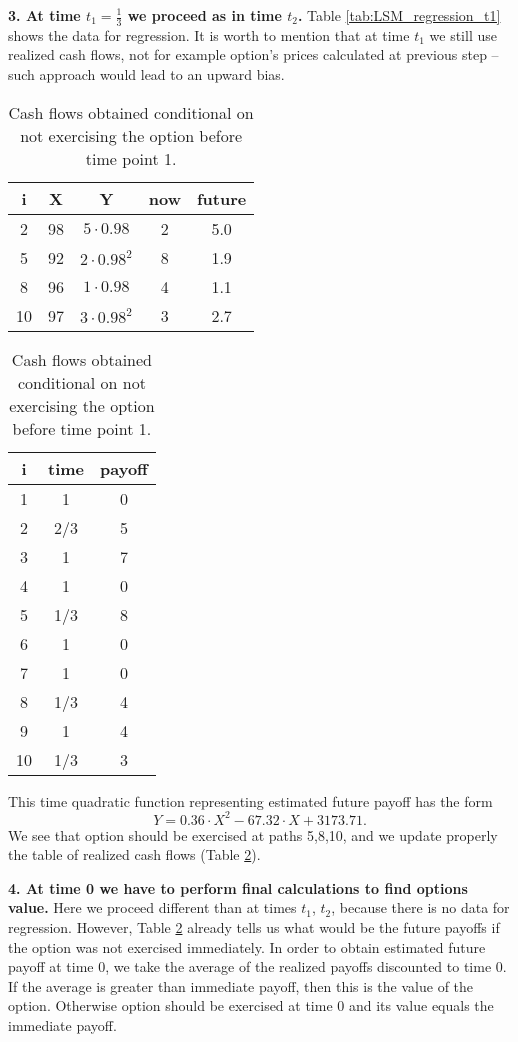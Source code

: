 \documentclass[a4paper,11pt, twoside]{book}
\theoremstyle{definition}
\theoremstyle{remark}
\newcounter{example}[chapter]
\begin{document}
\noindent \textbf{3. At time $t_1 = \frac{1}{3}$ we proceed as in time $t_2$.}
Table \ref{tab:LSM_regression_t1} shows the data for regression. It is worth to mention that at time $t_1$ we still use realized cash flows, not for example option's prices calculated at previous step -- such approach would lead to an upward bias.
\begin{table}[ht]
\parbox{.45\linewidth} {
  \centering
  \caption{Estimating future payoffs at time point 1.}
  \label{tab:LSM_regression_t1}
  \begin{tabular} {||c |c |c || c | c ||}  
  \hline 
    i & X   &  Y  & now   &  future\\ \hline \hline
    2 & 98 & $5\cdot 0.98$ & 2 & 5.0 \\ \hline
    5 & 92 & $2\cdot 0.98^2$ & 8 & 1.9  \\ \hline
    8 & 96 & $1\cdot 0.98$ & 4 & 1.1 \\ \hline
  10 & 97 & $3\cdot 0.98^2$ & 3 & 2.7 \\ \hline
  \end{tabular}
}
\qquad
\parbox{.45\linewidth} {
  \centering
  \caption{Cash flows obtained conditional on not exercising the option before time point 1.}
  \label{tab:LSM_cashflows_t1}
  \begin{tabular}{|| c | c | c ||}
  \hline 
  i  & time  &  payoff \\ \hline \hline
  1  & 1     &      0 \\ \hline
  2  & 2/3   &      5 \\ \hline
  3  & 1     &      7 \\ \hline
  4  & 1     &      0 \\ \hline
  5  & 1/3   &      8 \\ \hline
  6  & 1     &      0 \\ \hline
  7  & 1     &      0 \\ \hline
  8  & 1/3   &      4 \\ \hline
  9  & 1     &      4 \\ \hline
  10  & 1/3   &      3 \\ \hline
  \end{tabular}
}
\end{table}
This time quadratic function representing estimated future payoff has the form
\[ Y = 0.36\cdot X^2 - 67.32\cdot X + 3173.71. \]
We see that option should be exercised at paths 5,8,10, and we update properly the table of realized cash flows (Table \ref{tab:LSM_cashflows_t1}).

\noindent \textbf{4. At time 0 we have to perform final calculations to find options value.} Here we proceed different than at times $t_1$, $t_2$, because there is no data for regression. However, Table \ref{tab:LSM_cashflows_t1} already tells us what would be the future payoffs if the option was not exercised immediately. In order to obtain estimated future payoff at time 0, we take the average of the realized payoffs discounted to time 0. If the average is greater than immediate payoff, then this is the value of the option. Otherwise option should be exercised at time 0 and its value equals the immediate payoff.
\end{document}
